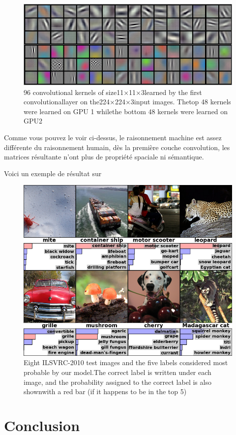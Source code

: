 \documentclass[12pt, letterpaper]{article}
\begin{document}
\begin{figure}[H]
    \includegraphics[width=\linewidth]{img/fig10.png}
    \caption{96 convolutional kernels of size11×11×3learned by the first convolutionallayer on the224×224×3input images. Thetop 48 kernels were learned on GPU 1 whilethe bottom 48 kernels were learned on GPU2}
    \label{fig:L9}
\end{figure}

Comme vous pouvez le voir ci-dessus, le raisonnement machine est assez différente du raisonnement humain, dès la première couche convolution, les matrices résultante n'ont plus 
de propriété spaciale ni sémantique. 

Voici un exemple de résultat sur 

\begin{figure}[H]
    \includegraphics[width=\linewidth]{img/fig11.png}
    \caption{Eight ILSVRC-2010 test images and the five labels considered most probable by our model.The correct label is written under each image, and the probability assigned to the correct label is also shownwith a red bar (if it happens to be in the top 5)}
    \label{fig:L10}
\end{figure}

\section{Conclusion}

\newpage
\printbibliography
\end{document}
